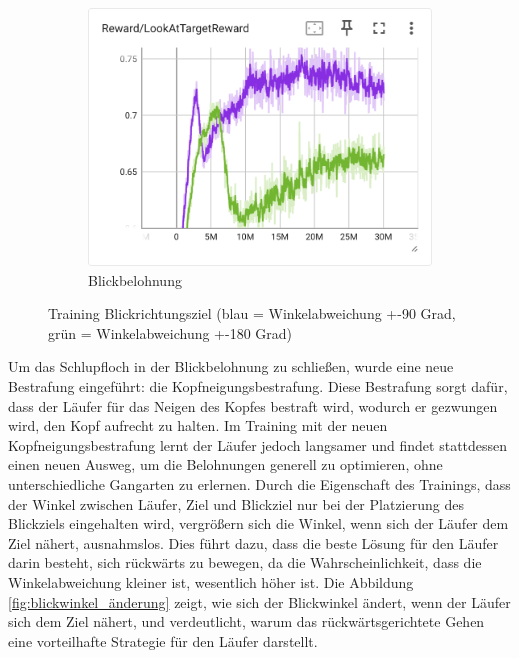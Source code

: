 \begin{figure}[H]
\begin{subfigure}{.49\textwidth}
      \centering  
      \includegraphics[width=\textwidth]{img/104_105_look_reward}
      \caption{Blickbelohnung}
      \label{fig:104_105_look_reward}
    \end{subfigure}
  \caption{Training Blickrichtungsziel (blau = Winkelabweichung +-90 Grad, grün = Winkelabweichung +-180 Grad)}
  \label{fig:training_blickrichtungsziel}
\end{figure}

Um das Schlupfloch in der Blickbelohnung zu schließen, wurde eine neue Bestrafung eingeführt: die Kopfneigungsbestrafung. Diese Bestrafung sorgt dafür, dass der Läufer für das Neigen des Kopfes bestraft wird, wodurch er gezwungen wird, den Kopf aufrecht zu halten. Im Training mit der neuen Kopfneigungsbestrafung lernt der Läufer jedoch langsamer und findet stattdessen einen neuen Ausweg, um die Belohnungen generell zu optimieren, ohne unterschiedliche Gangarten zu erlernen. Durch die Eigenschaft des Trainings, dass der Winkel zwischen Läufer, Ziel und Blickziel nur bei der Platzierung des Blickziels eingehalten wird, vergrößern sich die Winkel, wenn sich der Läufer dem Ziel nähert, ausnahmslos. Dies führt dazu, dass die beste Lösung für den Läufer darin besteht, sich rückwärts zu bewegen, da die Wahrscheinlichkeit, dass die Winkelabweichung kleiner ist, wesentlich höher ist. Die Abbildung \ref{fig:blickwinkel_änderung} zeigt, wie sich der Blickwinkel ändert, wenn der Läufer sich dem Ziel nähert, und verdeutlicht, warum das rückwärtsgerichtete Gehen eine vorteilhafte Strategie für den Läufer darstellt.

